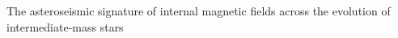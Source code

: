 The asteroseismic signature of internal magnetic fields across the evolution of intermediate-mass stars
  
  
